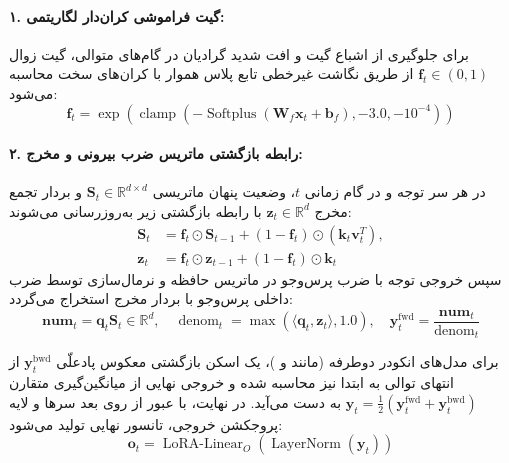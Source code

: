 \paragraph{۱. گیت فراموشی کران‌دار لگاریتمی:}
برای جلوگیری از اشباع گیت و افت شدید گرادیان در گام‌های متوالی، گیت زوال $\mathbf{f}_t \in (0, 1)$ از طریق نگاشت غیرخطی تابع پلاس هموار  با کران‌های سخت محاسبه می‌شود:
\begin{equation}
\mathbf{f}_t = \exp\left( \operatorname{clamp}\left( -\operatorname{Softplus}(\mathbf{W}_f \mathbf{x}_t + \mathbf{b}_f), -3.0, -10^{-4} \right) \right)
\end{equation}

\paragraph{۲. رابطه بازگشتی ماتریس ضرب بیرونی و مخرج:}
در هر سر توجه و در گام زمانی $t$، وضعیت پنهان ماتریسی $\mathbf{S}_t \in \mathbb{R}^{d \times d}$ و بردار تجمع مخرج $\mathbf{z}_t \in \mathbb{R}^d$ با رابطه بازگشتی زیر به‌روزرسانی می‌شوند:
\begin{align}
\mathbf{S}_t &= \mathbf{f}_t \odot \mathbf{S}_{t-1} + (1 - \mathbf{f}_t) \odot \left(\mathbf{k}_t \mathbf{v}_t^T\right), \\
\mathbf{z}_t &= \mathbf{f}_t \odot \mathbf{z}_{t-1} + (1 - \mathbf{f}_t) \odot \mathbf{k}_t
\end{align}
سپس خروجی توجه با ضرب پرس‌وجو در ماتریس حافظه و نرمال‌سازی توسط ضرب داخلی پرس‌وجو با بردار مخرج استخراج می‌گردد:
\begin{equation}
\mathbf{num}_t = \mathbf{q}_t \mathbf{S}_t \in \mathbb{R}^d, \quad \operatorname{denom}_t = \max\left(\langle \mathbf{q}_t, \mathbf{z}_t \rangle, 1.0\right), \quad \mathbf{y}_t^{\text{fwd}} = \frac{\mathbf{num}_t}{\operatorname{denom}_t}
\end{equation}

برای مدل‌های انکودر دوطرفه (مانند  و )، یک اسکن بازگشتی معکوس پادعلّی $\mathbf{y}_t^{\text{bwd}}$ از انتهای توالی به ابتدا نیز محاسبه شده و خروجی نهایی از میانگین‌گیری متقارن $\mathbf{y}_t = \frac{1}{2}(\mathbf{y}_t^{\text{fwd}} + \mathbf{y}_t^{\text{bwd}})$ به دست می‌آید. در نهایت، با عبور از  روی بعد سرها و لایه پروجکشن خروجی، تانسور نهایی تولید می‌شود:
\begin{equation}
\mathbf{o}_t = \operatorname{LoRA-Linear}_O\left( \operatorname{LayerNorm}(\mathbf{y}_t) \right)
\end{equation}

